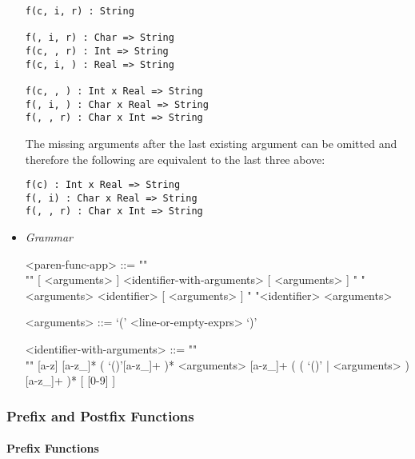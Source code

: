 \documentclass{article}
\begin{document}
\begin{itemize}
\begin{verbatim}
f(c, i, r) : String

f(, i, r) : Char => String
f(c, , r) : Int => String
f(c, i, ) : Real => String

f(c, , ) : Int x Real => String
f(, i, ) : Char x Real => String
f(, , r) : Char x Int => String
\end{verbatim}

The missing arguments after the last existing argument can be omitted and therefore
the following are equivalent to the last three above:

\begin{verbatim}
f(c) : Int x Real => String
f(, i) : Char x Real => String
f(, , r) : Char x Int => String
\end{verbatim}

\item \textit{Grammar}
\begin{grammar}
<paren-func-app> ::= ""\\""
[ <arguments> ] <identifier-with-arguments> [ <arguments> ]
\alt " "<arguments> <identifier> [ <arguments> ]
\alt " "<identifier> <arguments>

<arguments> ::= `(' <line-or-empty-exprs> `)'

<identifier-with-arguments> ::= ""\\""
[a-z] [a-z_]* ( `()'[a-z_]+ )* <arguments>
[a-z_]+ ( ( `()' | <arguments> ) [a-z_]+ )* 
[ [0-9] ]
\end{grammar}

\end{itemize}

\subsubsection{Prefix and Postfix Functions}
 
\paragraph{Prefix Functions}
\end{document}
